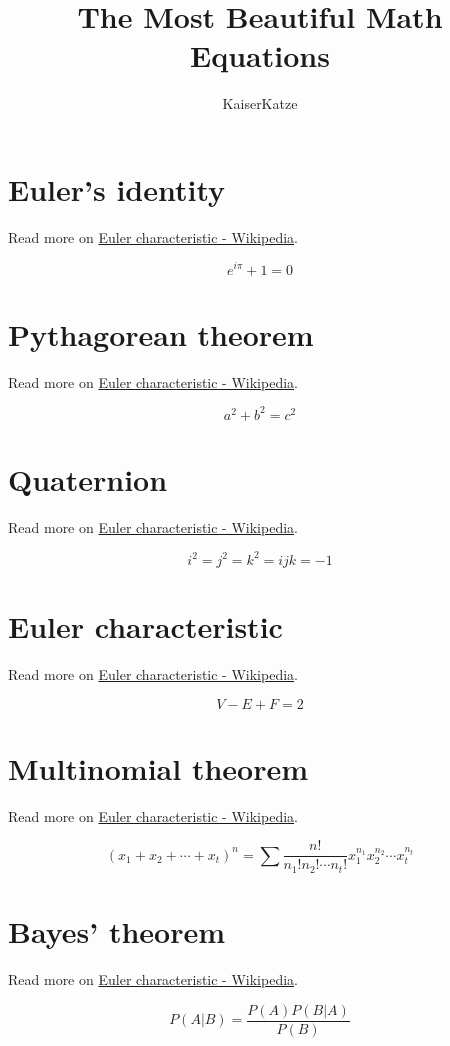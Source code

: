 \documentclass[12pt]{article}
\title{The Most Beautiful Math Equations}
\author{KaiserKatze}
\begin{document}
\maketitle

\section{Euler's identity}
Read more on \href{https://en.wikipedia.org/wiki/Euler\%27s_identity}{Euler characteristic - Wikipedia}.

$$ e^{i \pi} + 1 = 0 $$

\section{Pythagorean theorem}
Read more on \href{https://en.wikipedia.org/wiki/Pythagorean_theorem}{Euler characteristic - Wikipedia}.

$$ a^2 + b^2 = c^2 $$

\section{Quaternion}
Read more on \href{https://en.wikipedia.org/wiki/Quaternion}{Euler characteristic - Wikipedia}.

$$ i^2 = j^2 = k^2 = ijk = -1 $$

\section{Euler characteristic}
Read more on \href{https://en.wikipedia.org/wiki/Euler_characteristic}{Euler characteristic - Wikipedia}.

$$ V - E + F = 2 $$

\section{Multinomial theorem}
Read more on \href{https://en.wikipedia.org/wiki/Multinomial_theorem}{Euler characteristic - Wikipedia}.

$$ (x_1+x_2+\cdots+x_t)^n=\sum\frac{n!}{n_1!n_2!\cdots n_t!}x_1^{n_1}x_2^{n_2}\cdots x_t^{n_t} $$

\section{Bayes' theorem}
Read more on \href{https://en.wikipedia.org/wiki/Bayes\%27_theorem}{Euler characteristic - Wikipedia}.

$$ P\left(A|B\right) = \frac{P\left(A\right)P\left(B|A\right)}{P\left(B\right)} $$
\end{document}
